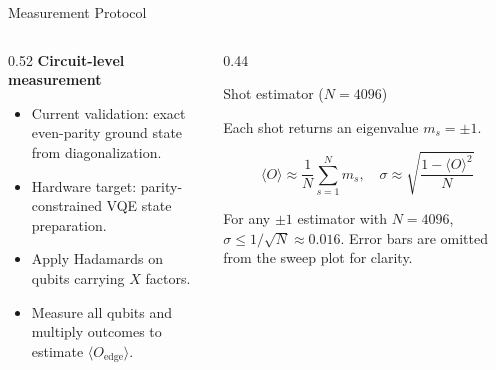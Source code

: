 \documentclass[aspectratio=169, 12pt]{beamer}
\begin{document}



\begin{frame}{Measurement Protocol}

  \begin{columns}[T]

    \begin{column}{0.52\textwidth}
      \textbf{Circuit-level measurement}

      \begin{itemize}\small
        \item Current validation: exact even-parity ground state from diagonalization.
        \item Hardware target: parity-constrained VQE state preparation.
        \item Apply Hadamards on qubits carrying $X$ factors.
        \item Measure all qubits and multiply outcomes to estimate $\langle O_{\mathrm{edge}}\rangle$.
      \end{itemize}
    \end{column}

    \begin{column}{0.44\textwidth}

      \begin{block}{Shot estimator ($N = 4096$)}\small

        Each shot returns an eigenvalue $m_s = \pm 1$.

        \[
          \langle O\rangle \approx \frac{1}{N}\sum_{s=1}^{N} m_s,
          \quad
          \sigma \approx \sqrt{\frac{1-\langle O\rangle^2}{N}}
        \]

        For any $\pm1$ estimator with $N=4096$, $\sigma\leq 1/\sqrt{N}\approx0.016$. Error bars are omitted from the sweep plot for clarity.

      \end{block}

    \end{column}

  \end{columns}

\end{frame}
\end{document}
